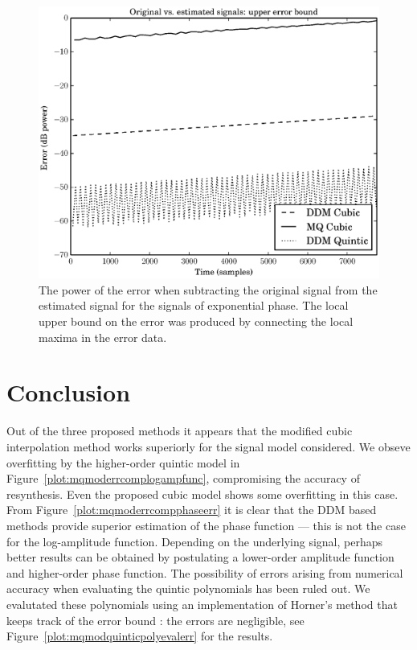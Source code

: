 \begin{figure}[!t]
    \centering
    \includegraphics[width=\figwidthscale\textwidth]{plots/mq_exp_err_comp_true_vs_est_err.eps}
    \caption{
        The power of the error when subtracting the original signal from the
        estimated signal for the signals of exponential phase. The local upper
        bound on the error was produced by connecting the local maxima in the
        error data.
    \label{plot:mqexperrortruevsesterr}}
\end{figure}

\section{Conclusion}

Out of the three proposed methods it appears that the modified cubic
interpolation method works superiorly for the signal model considered. We obseve
overfitting by the higher-order quintic model in
Figure~\ref{plot:mqmoderrcomplogampfunc}, compromising the accuracy of
resynthesis.  Even the proposed cubic model shows some overfitting in
this case. From Figure~\ref{plot:mqmoderrcompphaseerr} it is clear that the DDM
based methods provide superior estimation of the phase function --- this is not
the case for the log-amplitude function. Depending on the underlying signal,
perhaps better results can be obtained by postulating a lower-order amplitude
function and higher-order phase function. The possibility of errors arising from
numerical accuracy when evaluating the quintic polynomials has been ruled out.
We evalutated these polynomials using an implementation of Horner's method that
keeps track of the error bound \cite[p.~95]{higham2002accuracy}: the errors are
negligible, see Figure~\ref{plot:mqmodquinticpolyevalerr} for the results.


